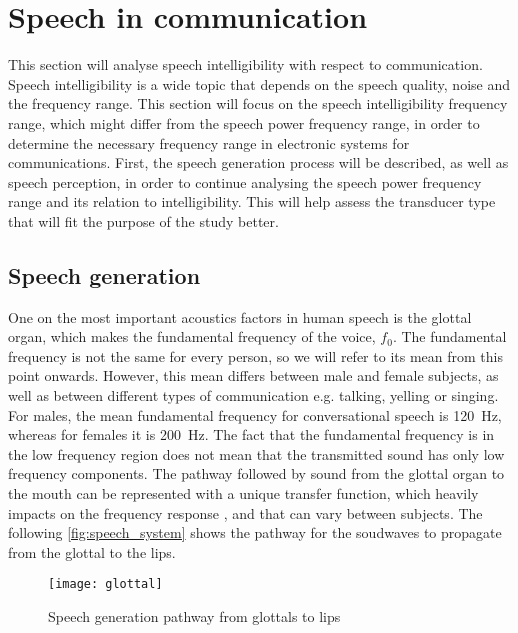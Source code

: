 \section{Speech in communication}
\label{speech_in_comm}

This section will analyse speech intelligibility with respect to communication. Speech intelligibility is a wide topic that depends on the speech quality, noise and the frequency range. This section will focus on the speech intelligibility frequency range, which might differ from the speech power frequency range, in order to determine the necessary frequency range in electronic systems for communications. First, the speech generation process will be described, as well as speech perception, in order to continue analysing the speech power frequency range and its relation to intelligibility. This will help assess the transducer type that will fit the purpose of the study better.

\subsection{Speech generation}

One on the most important acoustics factors in human speech is the glottal organ, which makes the fundamental frequency of the voice, $f_0$. The fundamental frequency is not the same for every person, so we will refer to its mean from this point onwards. However, this mean differs between male and female subjects, as well as between different types of communication e.g. talking, yelling or singing. For males, the mean fundamental frequency for conversational speech is \SI{120}{\hertz}, whereas for females it is \SI{200}{\hertz}. The fact that the fundamental frequency is in the low frequency region does not mean that the transmitted sound has only low frequency components. 
The pathway followed by sound from the glottal organ to the mouth can be represented with a unique transfer function, which heavily impacts on the frequency response \citep{pulkki2015}, and that can vary between subjects. The following \autoref{fig:speech_system} shows the pathway for the soudwaves to propagate from the glottal to the lips.

 \begin{figure}[H]
	\centering
		\texttt{[image: glottal]}
		\caption{Speech generation pathway from glottals to lips \citep{pulkki2015}}
		\label{fig:speech_system}
\end{figure}

